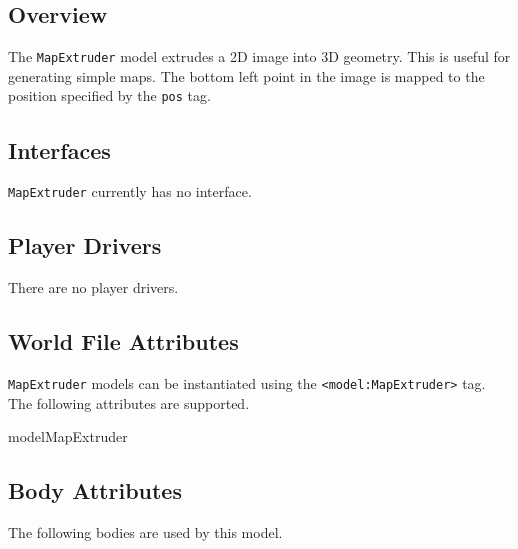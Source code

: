 

\subsection{Overview}

The {\tt MapExtruder} model extrudes a 2D image into 3D geometry. This
is useful for generating simple maps.  The bottom left point in the
image is mapped to the position specified by the {\tt pos} tag.

\subsection{\libgazebo Interfaces}

{\tt MapExtruder} currently has no \libgazebo interface.


\subsection{Player Drivers}

There are no player drivers.

\subsection{World File Attributes}

{\tt MapExtruder} models can be instantiated using the
\verb+<model:MapExtruder>+ tag.  The following attributes are
supported.

\begin{xmlattrtable}{model}{MapExtruder}
\modeldefaults
{}

\end{xmlattrtable}


\subsection{Body Attributes}

The following bodies are used by this model.

\begin{bodyattrtable}
\bodydefaults
\end{bodyattrtable}


